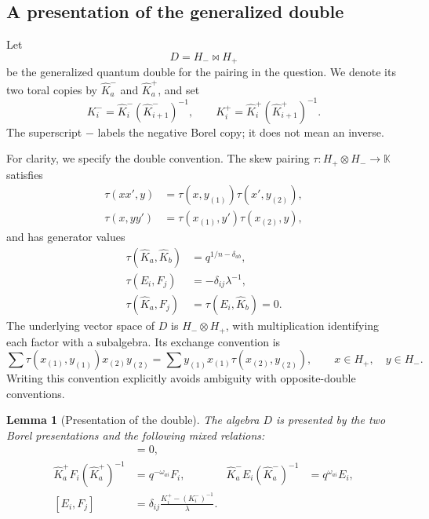 \documentclass[11pt]{amsart}
\newtheorem{lemma}[theorem]{Lemma}
\theoremstyle{remark}
\newcommand{\kk}{\mathbb{K}}
\begin{document}
\subsection{A presentation of the generalized double}

Let
\[
 D=H_-\bowtie H_+
\]
be the generalized quantum double for the pairing in the question.
We denote its two toral copies by $\widehat K_a^-$ and
$\widehat K_a^+$, and set
\[
 K_i^-=\widehat K_i^-(\widehat K_{i+1}^-)^{-1},
 \qquad
 K_i^+=\widehat K_i^+(\widehat K_{i+1}^+)^{-1}.
\]
The superscript $-$ labels the negative Borel copy; it does not
mean an inverse.

For clarity, we specify the double convention.  The skew pairing
$\tau:H_+\otimes H_-\to\kk$ satisfies
\[
 \begin{split}
 \tau(xx',y)&=\tau(x,y_{(1)})\tau(x',y_{(2)}),\\
 \tau(x,yy')&=\tau(x_{(1)},y')\tau(x_{(2)},y),
 \end{split}
\]
and has generator values
\begin{equation}\label{eq:pairing}
 \begin{split}
 \tau(\widehat K_a,\widehat K_b)&=q^{1/n-\delta_{ab}},\\
 \tau(E_i,F_j)&=-\delta_{ij}\lambda^{-1},\\
 \tau(\widehat K_a,F_j)&=\tau(E_i,\widehat K_b)=0.
 \end{split}
\end{equation}
The underlying vector space of $D$ is $H_-\otimes H_+$, with
multiplication identifying each factor with a subalgebra.  Its
exchange convention is
\begin{equation}\label{eq:double-exchange}
 \sum\tau(x_{(1)},y_{(1)})x_{(2)}y_{(2)}
 =
 \sum y_{(1)}x_{(1)}\tau(x_{(2)},y_{(2)}),
 \qquad x\in H_+,\quad y\in H_-.
\end{equation}
Writing this convention explicitly avoids ambiguity with
opposite-double conventions.

\begin{lemma}[Presentation of the double]\label{lem:double}
The algebra $D$ is presented by the two Borel presentations and
the following mixed relations:
\begin{align}
 [\widehat K_a^+,\widehat K_b^-]&=0,
 \label{eq:double-tori}\\
 \widehat K_a^+F_i(\widehat K_a^+)^{-1}
   &=q^{-\omega_{ai}}F_i,
 &
 \widehat K_a^-E_i(\widehat K_a^-)^{-1}
   &=q^{\omega_{ai}}E_i,
 \label{eq:double-weights}\\
 [E_i,F_j]
   &=\delta_{ij}\frac{K_i^+-(K_i^-)^{-1}}{\lambda}.
 \label{eq:double-EF}
\end{align}
\end{lemma}
\end{document}

